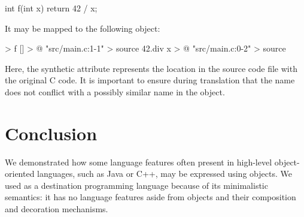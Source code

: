 \documentclass[sigplan,nonacm]{acmart}
\begin{document}
\begin{ffcode}
int f(int x) {
  return 42 / x;
}
\end{ffcode}

It may be mapped to the following \eolang{} object:

\begin{ffcode}
[x] > f
  [] > @
    "src/main.c:1-1" > source
    42.div x > @
  "src/main.c:0-2" > source
\end{ffcode}

Here, the synthetic  attribute represents the location in the source code file with the original C code. It is important to ensure during translation that the name  does not conflict with a possibly similar name in the object.

\section{Conclusion}

We demonstrated how some language features often present in high-level object-oriented languages, such as Java or C++, may be expressed using objects.
We used \eolang{} as a destination programming language because of its minimalistic semantics: it has no language features aside from objects and their composition and decoration mechanisms.

\raggedright


\end{document}
